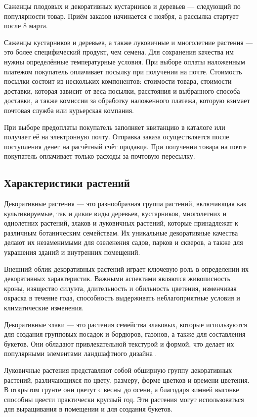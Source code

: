 Саженцы плодовых и декоративных кустарников и деревьев — следующий по популярности товар. Приём заказов начинается с ноября, а рассылка стартует после 8 марта.

Саженцы кустарников и деревьев, а также луковичные и многолетние растения — это более специфический продукт, чем семена. Для сохранения качества им нужны определённые температурные условия.
При выборе оплаты наложенным платежом покупатель оплачивает посылку при получении на почте. Стоимость посылки состоит из нескольких компонентов: стоимости товара, стоимости доставки, которая зависит от веса посылки, расстояния и выбранного способа доставки, а также комиссии за обработку наложенного платежа, которую взимает почтовая служба или курьерская компания.

При выборе предоплаты покупатель заполняет квитанцию в каталоге или получает её на электронную почту. Отправка заказа осуществляется после поступления денег на расчётный счёт продавца. При получении товара на почте покупатель оплачивает только расходы за почтовую пересылку.


\subsection{Характеристики растений}
Декоративные растения — это разнообразная группа растений, включающая как культивируемые, так и дикие виды деревьев, кустарников, многолетних и однолетних растений, злаков и луковичных растений, которые принадлежат к различным ботаническим семействам. Их уникальные декоративные качества делают их незаменимыми для озеленения садов, парков и скверов, а также для украшения зданий и внутренних помещений.

Внешний облик декоративных растений играет ключевую роль в определении их декоративных характеристик. Важными аспектами являются живописность кроны, изящество силуэта, длительность и обильность цветения, изменчивая окраска в течение года, способность выдерживать неблагоприятные условия и климатические изменения.

Декоративные злаки — это растения семейства злаковых, которые используются для создания групповых посадок и бордюров, газонов, а также для составления букетов. Они обладают привлекательной текстурой и формой, что делает их популярными элементами ландшафтного дизайна \cite{kingsberry}.

Луковичные растения представляют собой обширную группу декоративных растений, различающихся по цвету, размеру, форме цветков и времени цветения. В открытом грунте они цветут с весны до осени, а благодаря зимней выгонке способны цвести практически круглый год. Эти растения могут использоваться для выращивания в помещении и для создания букетов.

